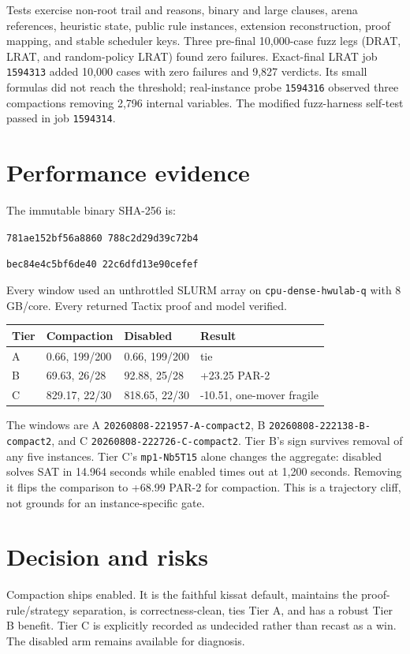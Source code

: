 \documentclass[11pt]{article}
\begin{document}
Tests exercise non-root trail and reasons, binary and large clauses, arena
references, heuristic state, public rule instances, extension reconstruction,
proof mapping, and stable scheduler keys.  Three pre-final 10,000-case fuzz
legs (DRAT, LRAT, and random-policy LRAT) found zero failures.  Exact-final
LRAT job \texttt{1594313} added 10,000 cases with zero failures and 9,827
verdicts.  Its small formulas did not reach the threshold; real-instance probe
\texttt{1594316} observed three compactions removing 2,796 internal variables.
The modified fuzz-harness self-test passed in job \texttt{1594314}.

\section{Performance evidence}
The immutable binary SHA-256 is:
\begin{center}
\small\texttt{781ae152bf56a8860 788c2d29d39c72b4}\par
\texttt{bec84e4c5bf6de40 22c6dfd13e90cefef}
\end{center}
Every window used an unthrottled SLURM array on \texttt{cpu-dense-hwulab-q}
with 8 GB/core.  Every returned Tactix proof and model verified.

\begin{center}
\begin{tabular}{@{}llll@{}}
\toprule
Tier & Compaction & Disabled & Result \\
\midrule
A & 0.66, 199/200 & 0.66, 199/200 & tie \\
B & 69.63, 26/28 & 92.88, 25/28 & +23.25 PAR-2 \\
C & 829.17, 22/30 & 818.65, 22/30 & -10.51, one-mover fragile \\
\bottomrule
\end{tabular}
\end{center}

The windows are A \texttt{20260808-221957-A-compact2}, B
\texttt{20260808-222138-B-compact2}, and C
\texttt{20260808-222726-C-compact2}.  Tier B's sign survives removal of any five
instances.  Tier C's \texttt{mp1-Nb5T15} alone changes the aggregate:
disabled solves SAT in 14.964 seconds while enabled times out at 1,200 seconds.
Removing it flips the comparison to +68.99 PAR-2 for compaction.  This is a
trajectory cliff, not grounds for an instance-specific gate.

\section{Decision and risks}
Compaction ships enabled.  It is the faithful kissat default, maintains the
proof-rule/strategy separation, is correctness-clean, ties Tier A, and has a
robust Tier B benefit.  Tier C is explicitly recorded as undecided rather than
recast as a win.  The disabled arm remains available for diagnosis.
\end{document}
